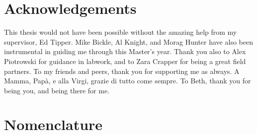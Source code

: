 \documentclass[hidelinks, 12pt]{article} %
\begin{document}
\newpage


\tableofcontents


\newpage


\section*{Acknowledgements}

This thesis would not have been possible without the amazing help from my supervisor, Ed Tipper. Mike Bickle, Al Knight, and Morag Hunter have also been instrumental in guiding me through this Master's year. Thank you also to Alex Piotrowski for guidance in labwork, and to Zara Crapper for being a great field partners. To my friends and peers, thank you for supporting me as always. A Mamma, Papà, e alla Virgi, grazie di tutto come sempre. To Beth, thank you for being you, and being there for me.


\newpage

\section*{Nomenclature}
\end{document}
